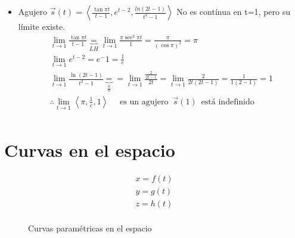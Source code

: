 \begin{itemize}
    \item Agujero $\vec{s}(t) = \left\langle \frac{\tan \pi t }{t-1} , e^{t-2}, \frac{ln(2t-1)}{t^2-1}  \right\rangle $ \newline 
     No es contínua en t=1, pero su límite existe.
     \begin{align*}
         \lim_{t \to 1} \frac{\tan \pi t}{t-1} \underbrace{=}_{LH} \lim_{t \to 1} \frac{\pi \sec^2 \pi t }{1} = \frac{\pi}{(\cos \pi)^2} = \pi \\ 
        \lim_{t \to 1} e^{t-2 } = e^-1 = \frac{1}{e} \\ 
        \lim_{t \to 1} \frac{\ln(2t-1)}{t^2-1} \underbrace{=}_{\frac{0}{0}} = \lim_{t \to 1} \frac{\frac{2}{2t-1} }{2t} = \lim_{t \to 1} \frac{2}{2t(2t-1)} = \frac{1}{1(2-1)} = 1 \\ 
        \therefore \lim_{t \to 1} \left\langle \pi, \frac{1}{e}, 1 \right\rangle \quad \text{  es un agujero   } \, \vec{s}(1) \, \text{  está indefinido  } \\   
     \end{align*}
\end{itemize}


\section{Curvas en el espacio}

\begin{align*}
    x = f(t) \\ 
    y = g(t) \\ 
    z = h(t) \\ 
\end{align*}
\begin{figure}[htbp]
    \centering
    \caption{Curvas paramétricas en el espacio}
    \label{}
\end{figure}


